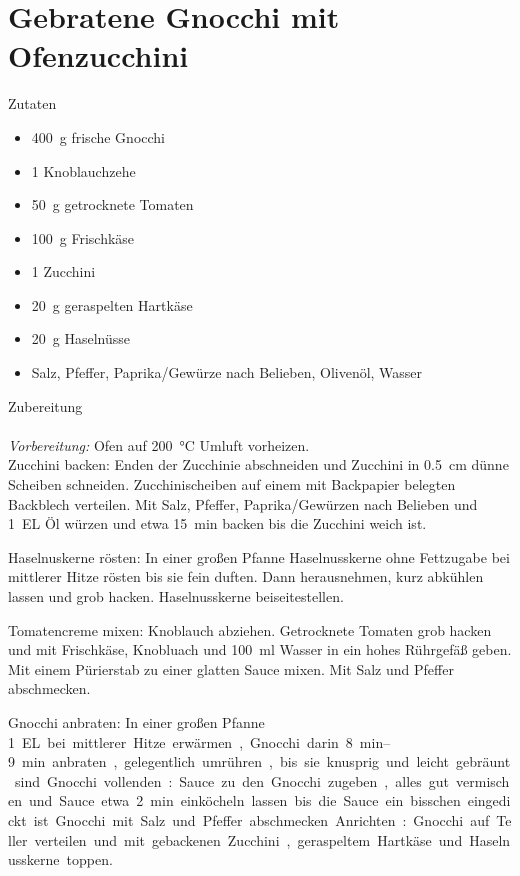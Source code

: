 \section*{Gebratene Gnocchi mit Ofenzucchini}
\ihead{}\ohead{}
\cfoot{}
{\Large Zutaten}
\begin{multicols}{2}
\begin{itemize}
    \item \SI{400}{g} frische Gnocchi
    \item \num{1} Knoblauchzehe
    \item \SI{50}{g} getrocknete Tomaten
    \item \SI{100}{g} Frischkäse
    \item \num{1} Zucchini
    \item \SI{20}{g} geraspelten Hartkäse
    \item \SI{20}{g} Haselnüsse
    \item Salz, Pfeffer, Paprika/Gewürze nach Belieben, Olivenöl, Wasser
\end{itemize}
\end{multicols}
\noindent
{\Large Zubereitung}\\
\\
\textit{Vorbereitung:} Ofen auf \SI{200}{\celsius} Umluft vorheizen.\\
Zucchini backen: Enden der Zucchinie abschneiden und Zucchini in \SI{0.5}{cm} dünne Scheiben schneiden.
Zucchinischeiben auf einem mit Backpapier belegten Backblech verteilen.
Mit Salz, Pfeffer, Paprika/Gewürzen nach Belieben und \SI{1}{EL} Öl würzen und etwa \SI{15}{min} backen bis die Zucchini weich ist.

Haselnuskerne rösten: In einer großen Pfanne Haselnusskerne ohne Fettzugabe bei mittlerer Hitze rösten bis sie fein duften.
Dann herausnehmen, kurz abkühlen lassen und grob hacken. 
Haselnusskerne beiseitestellen. 

Tomatencreme mixen: Knoblauch abziehen.
Getrocknete Tomaten grob hacken und mit Frischkäse, Knobluach und \SI{100}{ml} Wasser in ein hohes Rührgefäß geben. 
Mit einem Pürierstab zu einer glatten Sauce mixen. 
Mit Salz und Pfeffer abschmecken. 

Gnocchi anbraten: In einer großen Pfanne \SI{1} EL bei mittlerer Hitze erwärmen, Gnocchi darin \SIrange{8}{9}{min} anbraten, gelegentlich umrühren, bis sie knusprig und leicht gebräunt sind.

Gnocchi vollenden: Sauce zu den Gnocchi zugeben, alles gut vermischen und Sauce etwa \SI{2}{min} einköcheln lassen bis die Sauce ein bisschen eingedickt ist. 
Gnocchi mit Salz und Pfeffer abschmecken. 

Anrichten: Gnocchi auf Teller verteilen und mit gebackenen Zucchini, geraspeltem Hartkäse und Haselnusskerne toppen.